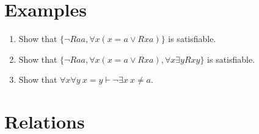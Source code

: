 \documentclass[a4paper, 11pt]{article} %
\newcommand{\set}[1]{\lbrace#1\rbrace} %
\newcommand{\qt}[2]{#1 #2} %
\begin{document}
\section*{Examples}

\begin{enumerate}
\item Show that $\set{{\neg}Raa, \qt{\forall}{x} (x{=}a \vee Rxa)}$ is satisfiable. 
  \item Show that $\set{{\neg}Raa, \qt{\forall}{x} (x{=}a \vee Rxa), \qt{\forall}{x}\qt{\exists}{y}Rxy}$ is satisfiable. 
\item Show that $\qt{\forall}{x}\qt{\forall}{y}\ x{=}y \vdash \neg \qt{\exists}{x}\ x \neq a$.
\end{enumerate}






\section*{Relations}
\end{document}
